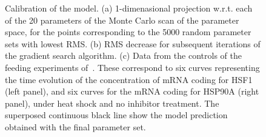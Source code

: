 \documentclass[oneside, 10pt, a4paper, twocolumn]{article}
\begin{document}
\begin{figure}
{  }%
\endminipage\hfill
{}
\endminipage\hfill
\caption{\small{Calibration of the model. (a) 1-dimenasional projection w.r.t. each of the 20 parameters of the Monte Carlo scan of the parameter space, for the points corresponding to the 5000 random parameter sets with lowest RMS. (b) RMS decrease for subsequent iterations of the gradient search algorithm. (c) Data from the controls of the feeding
experiments of~\cite{Schmollinger2013}. These correspond to six curves
representing the time evolution of the concentration of mRNA coding
for HSF1 (left panel), and six curves for the mRNA coding for HSP90A (right panel), under heat
shock and no inhibitor treatment. The superposed continuous black line show the model prediction obtained with the final parameter set.}}
  \label{Fig2ModelCalibration}
\end{figure}

\clearpage
\end{document}
